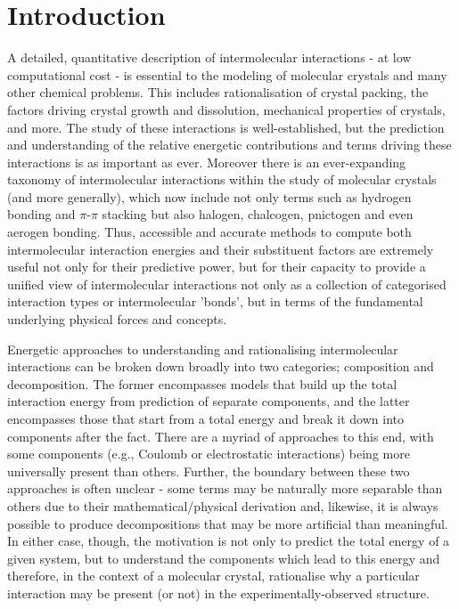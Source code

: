 \documentclass[preprint]{iucr}              %
\begin{document}
\section{Introduction}

A detailed, quantitative description of intermolecular interactions - at low computational cost - is essential to 
the modeling of molecular crystals and many other chemical problems. This includes rationalisation of crystal packing, 
the factors driving crystal growth and dissolution, mechanical properties of crystals, and more.
The study of these interactions is well-established, but the prediction and understanding of
the relative energetic contributions and terms driving these interactions is as important as ever.
Moreover there is an ever-expanding taxonomy of intermolecular interactions within the study of molecular crystals
(and more generally), which now include not only terms such as hydrogen bonding and $\pi$-$\pi$ stacking 
but also halogen, chalcogen, pnictogen and even aerogen bonding. Thus, accessible and accurate methods to compute
both intermolecular interaction energies and their substituent factors are extremely useful not only for their
predictive power, but for their capacity to provide a unified view of intermolecular interactions not only as a collection of categorised interaction types or intermolecular 'bonds', but in terms of the fundamental underlying
physical forces and concepts.

Energetic approaches to understanding and rationalising intermolecular interactions can be broken down broadly
into two categories; composition and decomposition. The former encompasses models that build up the total interaction 
energy from prediction of separate components, and the latter encompasses those that start from a total energy and
break it down into components after the fact. There are a myriad of approaches to this end, with some components 
(e.g., Coulomb or electrostatic interactions) being more universally present than others. Further, the boundary
between these two approaches is often unclear - some terms may be naturally more separable than others due to their 
mathematical/physical derivation and, likewise, it is always possible to produce decompositions that may
be more artificial than meaningful. In either case, though, the motivation is not only to predict the total energy of 
a given system, but to understand the components which lead to this energy and therefore, in the context of a molecular
crystal, rationalise why a particular interaction may be present (or not) in the experimentally-observed structure.
\end{document}
